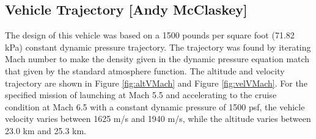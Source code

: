 \subsection{Vehicle Trajectory [Andy McClaskey]}
The design of this vehicle was based on a 1500 pounds per square foot (71.82 kPa) constant dynamic pressure trajectory. The trajectory was found by iterating Mach number to make the density given in the dynamic pressure equation match that given by the standard atmosphere function. The altitude and velocity trajectory are shown in Figure \ref{fig:altVMach} and Figure \ref{fig:velVMach}. For the specified mission of launching at Mach 5.5 and accelerating to the cruise condition at Mach 6.5 with a constant dynamic pressure of 1500 psf, the vehicle velocity varies between 1625 m/s and 1940 m/s, while the altitude varies between 23.0 km and 25.3 km.